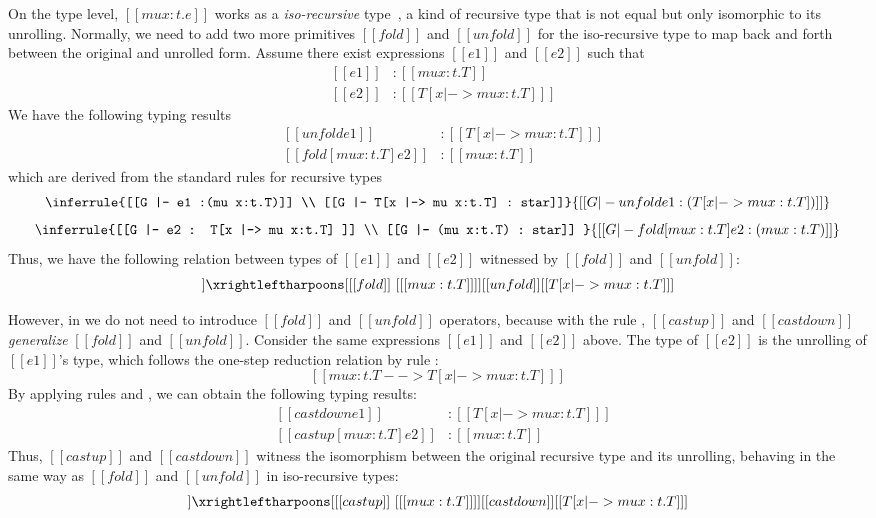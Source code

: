 On the type level, $[[mu x:t.e]]$ works as a \emph{iso-recursive}
type~\cite{eqi:iso}, a kind of recursive type that is not equal but only isomorphic
to its unrolling. Normally, we need to add two more primitives
$[[fold]]$ and $[[unfold]]$ for the iso-recursive type to map back
and forth between the original and unrolled form. Assume there exist
expressions $[[e1]]$ and $[[e2]]$ such that
\[\begin{array}{lll}
  &[[e1]] &: [[mu x:t.T]]\\
  &[[e2]] &: [[T [x |-> mu x:t.T] ]]
\end{array}\]
We have the following typing results
\[\begin{array}{lll}
  &[[unfold e1]] &: [[T [x |-> mu x:t.T] ]]\\
  &[[fold [mu x:t.T] e2]] &: [[mu x:t.T]]
\end{array}\]
which are derived from the standard rules for recursive types~\cite{tapl}
\[ \inferrule{[[G |- e1 :(mu x:t.T)]] \\ [[G |- T[x |-> mu x:t.T] : star]]}
   {[[G |- unfold e1 : (T[x |-> mu x:t.T]) ]]} \]
\[ \inferrule{[[G |- e2 : T[x |-> mu x:t.T] ]] \\ [[G |- (mu x:t.T) : star]] }
   {[[G |- fold [mu x:t.T] e2 : (mu x:t.T) ]]} \]
Thus, we have the following relation between types of $[[e1]]$ and $[[e2]]$
witnessed by $[[fold]]$ and $[[unfold]]$:
\begin{align*}
  [[mu x:t.T]] \xrightleftharpoons[{[[fold]]~[ [[mu x:t.T]] ]}]
  {[[unfold]]} [[T[x |-> mu x:t.T] ]]
\end{align*}

However, in \name we do not need to introduce $[[fold]]$ and
$[[unfold]]$ operators, because with the rule ,
$[[castup]]$ and $[[castdown]]$ \emph{generalize} $[[fold]]$ and $[[unfold]]$.
Consider the same expressions $[[e1]]$ and $[[e2]]$ above. The type of
$[[e2]]$ is the unrolling of $[[e1]]$'s type, which follows the
one-step reduction relation by rule :
\[ [[mu x:t.T --> T [x |-> mu x:t.T] ]] \]
By applying rules  and , we
can obtain the following typing results:
\[\begin{array}{lll}
	&[[castdown e1]] &: [[T [x |-> mu x:t.T] ]]\\
	&[[castup [mu x:t.T] e2]] &: [[mu x:t.T]]
\end{array}\]
Thus, $[[castup]]$ and $[[castdown]]$ witness the isomorphism between
the original recursive type and its unrolling, behaving in the
same way
as $[[fold]]$ and $[[unfold]]$ in iso-recursive types:
\begin{align*}
  [[mu x:t.T]] \xrightleftharpoons[{[[castup]]~[ [[mu x:t.T]]
  ]}]{[[castdown]]} [[T[x |-> mu x:t.T] ]]
\end{align*}


